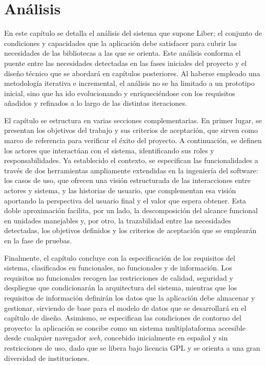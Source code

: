 \chapter{Análisis}
En este capítulo se detalla el análisis del sistema que supone Liber; el conjunto de 
condiciones y capacidades que la aplicación debe satisfacer para cubrir las necesidades de las bibliotecas a las que se orienta. Este análisis conforma el puente entre las necesidades detectadas en las fases iniciales del proyecto y el diseño técnico que se abordará en capítulos posteriores. Al haberse empleado una metodología iterativa e incremental, el análisis no se ha limitado a un prototipo inicial, sino que ha ido evolucionando y enriqueciéndose con los requisitos añadidos y refinados a lo largo de las distintas iteraciones.

El capítulo se estructura en varias secciones complementarias. En primer lugar, se presentan los objetivos del trabajo y sus criterios de aceptación, que sirven como marco de referencia para verificar el éxito del proyecto. A continuación, se definen los actores que interactúan con el sistema, identificando sus roles y responsabilidades. Ya establecido el contexto, se especifican las funcionalidades a través de dos herramientas ampliamente extendidas en la ingeniería del software: los casos de uso, que ofrecen una visión estructurada de las interacciones entre actores y sistema, y las historias de usuario, que complementan esa visión aportando la perspectiva del usuario final y el valor que espera obtener. Esta doble aproximación facilita, por un lado, la descomposición del alcance funcional en unidades manejables y, por otro, la trazabilidad entre las necesidades detectadas, los objetivos definidos y los criterios de aceptación que se emplearán en la fase de pruebas.

Finalmente, el capítulo concluye con la especificación de los requisitos del sistema, clasificados en funcionales, no funcionales y de información. Los requisitos no funcionales recogen las restricciones de calidad, seguridad y despliegue que condicionarán la arquitectura del sistema, mientras que los requisitos de información definirán los datos que la aplicación debe almacenar y gestionar, sirviendo de base para el modelo de datos que se desarrollará en el capítulo de diseño. Asimismo, se especifican las condiciones de contorno del proyecto: la aplicación se concibe como un sistema multiplataforma accesible desde cualquier navegador \textit{web}, concebido inicialmente en español y sin restricciones de uso, dado que se libera bajo licencia GPL y se orienta a una gran diversidad de instituciones.


